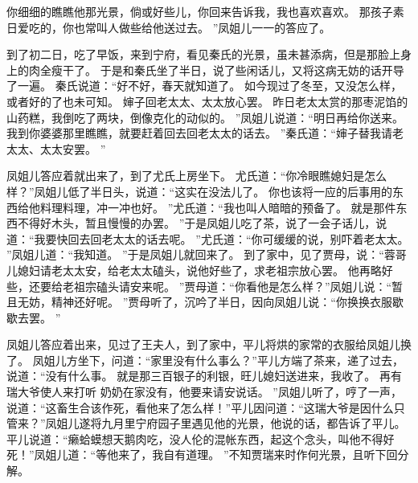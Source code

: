 你细细的瞧瞧他那光景，倘或好些儿，你回来告诉我，我也喜欢喜欢。
那孩子素日爱吃的，你也常叫人做些给他送过去。
”凤姐儿一一的答应了。
\par
到了初二日，吃了早饭，来到宁府，看见秦氏的光景，虽未甚添病，但是那脸上身上的肉全瘦干了。
于是和秦氏坐了半日，说了些闲话儿，又将这病无妨的话开导了一遍。
秦氏说道：“好不好，春天就知道了。
如今现过了冬至，又没怎么样，或者好的了也未可知。
婶子回老太太、太太放心罢。
昨日老太太赏的那枣泥馅的山药糕，我倒吃了两块，倒像克化的动似的。
”凤姐儿说道：“明日再给你送来。
我到你婆婆那里瞧瞧，就要赶着回去回老太太的话去。
”秦氏道：“婶子替我请老太太、太太安罢。
”\par
凤姐儿答应着就出来了，到了尤氏上房坐下。
尤氏道：“你冷眼瞧媳妇是怎么样？”凤姐儿低了半日头，说道：“这实在没法儿了。
你也该将一应的后事用的东西给他料理料理，冲一冲也好。
”尤氏道：“我也叫人暗暗的预备了。
就是那件东西不得好木头，暂且慢慢的办罢。
”于是凤姐儿吃了茶，说了一会子话儿，说道：“我要快回去回老太太的话去呢。
”尤氏道：“你可缓缓的说，别吓着老太太。
”凤姐儿道：“我知道。
”于是凤姐儿就回来了。
到了家中，见了贾母，说：“蓉哥儿媳妇请老太太安，给老太太磕头，说他好些了，求老祖宗放心罢。
他再略好些，还要给老祖宗磕头请安来呢。
”贾母道：“你看他是怎么样？”凤姐儿说：“暂且无妨，精神还好呢。
”贾母听了，沉吟了半日，因向凤姐儿说：“你换换衣服歇歇去罢。
”\par
凤姐儿答应着出来，见过了王夫人，到了家中，平儿将烘的家常的衣服给凤姐儿换了。
凤姐儿方坐下，问道：“家里没有什么事么？”平儿方端了茶来，递了过去，说道：“没有什么事。
就是那三百银子的利银，旺儿媳妇送进来，我收了。
再有瑞大爷使人来打听
奶奶在家没有，他要来请安说话。
”凤姐儿听了，哼了一声，说道：“这畜生合该作死，看他来了怎么样！”平儿因问道：“这瑞大爷是因什么只管来？”凤姐儿遂将九月里宁府园子里遇见他的光景，他说的话，都告诉了平儿。
平儿说道：“癞蛤蟆想天鹅肉吃，没人伦的混帐东西，起这个念头，叫他不得好死！”凤姐儿道：“等他来了，我自有道理。
”不知贾瑞来时作何光景，且听下回分解。
\par
